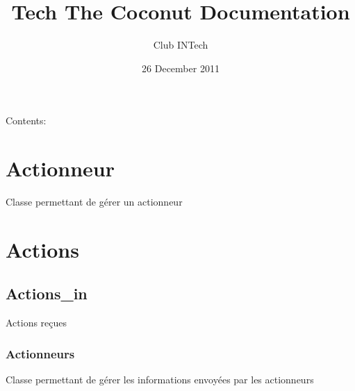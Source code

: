 \documentclass[letterpaper,10pt,french]{sphinxmanual}
\title{Tech The Coconut Documentation}
\date{26 December 2011}
\author{Club INTech}
\begin{document}
\maketitle
\tableofcontents
{}\label{index::doc}


Contents:


\chapter{Actionneur}
\label{actionneur:actionneur}\label{actionneur::doc}\label{actionneur:welcome-to-tech-the-coconut-s-documentation}\label{actionneur:module-lib.actionneur}

\begin{fulllineitems}
\label{actionneur:lib.actionneur.Actionneur}
Classe permettant de gérer un actionneur

\end{fulllineitems}



\chapter{Actions}
\label{actions::doc}\label{actions:actions}

\section{Actions\_in}
\label{actions:actions-in}
Actions reçues


\subsection{Actionneurs}
\label{actions:actionneurs}\label{actions:module-lib.actions_in.actionneurs_in}

\begin{fulllineitems}
\label{actions:lib.actions_in.actionneurs_in.Actionneurs_in}
Classe permettant de gérer les informations envoyées par les actionneurs

\end{fulllineitems}
\end{document}
